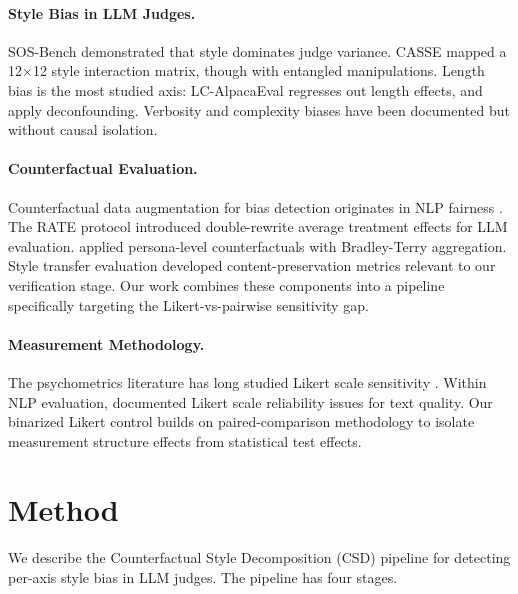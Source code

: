 \documentclass[11pt,a4paper]{article}
\newcommand{\sys}{CSD}
\begin{document}
\paragraph{Style Bias in LLM Judges.}
SOS-Bench \citep{wu2024style} demonstrated that style dominates judge variance.
CASSE \citep{lu2025casse} mapped a 12$\times$12 style interaction matrix, though with entangled manipulations.
Length bias is the most studied axis: LC-AlpacaEval \citep{dubois2024length} regresses out length effects, and \citet{park2024disentangling} apply deconfounding.
Verbosity and complexity biases have been documented \citep{saito2023verbosity,wu2024style} but without causal isolation.

\paragraph{Counterfactual Evaluation.}
Counterfactual data augmentation for bias detection originates in NLP fairness \citep{kaushik2020learning,gardner2020evaluating}.
The RATE protocol \citep{feuer2025rate} introduced double-rewrite average treatment effects for LLM evaluation.
\citet{zhou2025counterfactual} applied persona-level counterfactuals with Bradley-Terry aggregation.
Style transfer evaluation \citep{mir2019evaluating,krishna2020reformulating} developed content-preservation metrics relevant to our verification stage.
Our work combines these components into a pipeline specifically targeting the Likert-vs-pairwise sensitivity gap.

\paragraph{Measurement Methodology.}
The psychometrics literature has long studied Likert scale sensitivity \citep{likert1932technique,jamieson2004likert}.
Within NLP evaluation, \citet{karpinska2021perils} documented Likert scale reliability issues for text quality.
Our binarized Likert control builds on paired-comparison methodology \citep{thurstone1927law,david1963method} to isolate measurement structure effects from statistical test effects.

\section{Method}

We describe the Counterfactual Style Decomposition (\sys{}) pipeline for detecting per-axis style bias in LLM judges.
The pipeline has four stages.
\end{document}
